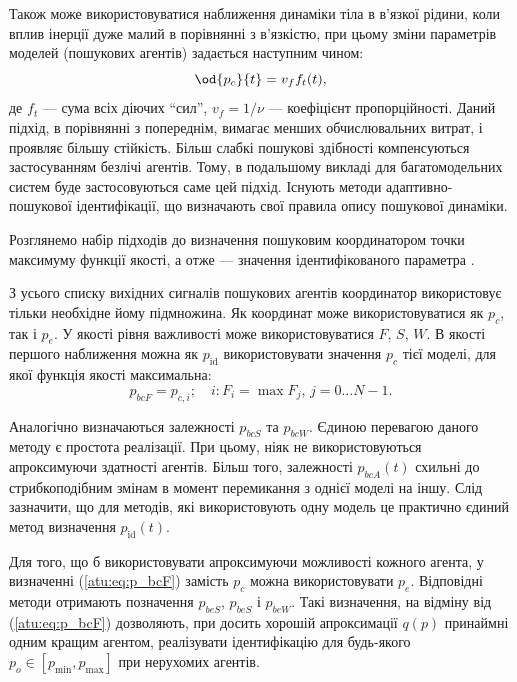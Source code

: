 \documentclass[a4paper,13pt]{atuaref}
\begin{document}
Також може використовуватися наближення динаміки тіла в в'язкої рідини, коли
вплив інерції дуже малий в порівнянні з в'язкістю, при цьому зміни параметрів
моделей (пошукових агентів) задається наступним чином:
%
\begin{equation}
  \od{p_c}{t} = v_f f_t(t),
  \label{atu:eq:v_f}
\end{equation}
%
\noindent
де $ f_t $ --- сума всіх діючих ``сил'',
$ v_f = 1 / \nu $ --- коефіцієнт
пропорційності. Даний підхід, в порівнянні з попереднім, вимагає менших
обчислювальних витрат, і проявляє більшу стійкість. Більш слабкі пошукові
здібності компенсуються застосуванням безлічі агентів. Тому, в подальшому
викладі для багатомодельних систем буде застосовуються саме цей підхід.
Існують методи адаптивно-пошукової ідентифікації, що визначають свої правила опису пошукової динаміки.


Розглянемо набір підходів до визначення пошуковим координатором точки максимуму
функції якості, а отже --- значення ідентифікованого параметра
\cite{atu_st99,atu_jacs2015}.

З усього списку вихідних сигналів пошукових агентів координатор використовує
тільки необхідне йому підмножина. Як координат може використовуватися як
$ p_c$, так і $ p_e $.
У якості рівня важливості може використовуватися $ F $, $ S $, $W$.
В якості першого наближення можна як $ p_\mathrm{id} $ використовувати
значення $ p_c $ тієї моделі, для якої функція якості максимальна:
%
\begin{equation}
  p_{bcF}
  =
  p_{c,i};
  \quad
  i : F_i = \max{F_j}, \, j=0 \ldots N-1 .
  \label{atu:eq:p_bcF}
\end{equation}

Аналогічно визначаються залежності
$p_{bcS}$ та $p_{bcW}$.
Єдиною перевагою даного методу є простота реалізації. При цьому, ніяк не
використовуються апроксимуючи здатності агентів. Більш того, залежності
$ p_{bcA} (t) $ схильні до стрибкоподібним змінам в момент перемикання з однієї моделі
на іншу. Слід зазначити, що для методів, які використовують одну модель це
практично єдиний метод визначення
$p_\mathrm{id}(t)$.

Для того, що б використовувати апроксимуючи можливості кожного агента, у
визначенні (\ref{atu:eq:p_bcF}) замість $ p_c $ можна використовувати $ p_e$.
Відповідні методи отримають позначення $ p_ {beS} $, $ p_ {beS} $ і $ p_{beW} $.
Такі визначення, на відміну від (\ref{atu:eq:p_bcF}) дозволяють,
при досить хорошій апроксимації $ q (p) $ принаймні одним кращим агентом,
реалізувати ідентифікацію для будь-якого
$ p_o \in [p_{\min} , p_{\max}]$ при нерухомих агентів.
\end{document}
